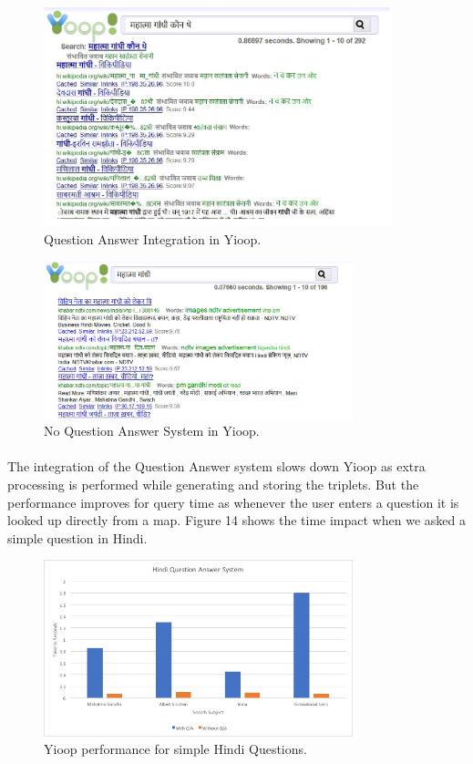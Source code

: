 \begin{figure}[htb]
\centering
\includegraphics[width=0.9\textwidth]{images/QA_IntegratedInYioop.jpg}
\caption{Question Answer Integration in Yioop.} 
\label{fig:QA_IntegratedInYioop}
\end{figure}
\break

\begin{figure}[htb]
\centering
\includegraphics[width=0.8\textwidth]{images/Yioop_NoQA.jpg}
\caption{No Question Answer System in Yioop.} 
\label{fig:Yioop_NoQA}
\end{figure}

\paragraph{}
The integration of the Question Answer system slows down Yioop as extra processing is performed while generating and storing the triplets. But the performance improves for query time as whenever the  user enters a question it is looked up directly from a map. Figure 14 shows the time impact when we asked a simple question in Hindi.

\begin{figure}[htb]
\centering
\includegraphics[width=0.8\textwidth]{images/QA_performance1.jpg}
\caption{Yioop performance for simple Hindi Questions.} 
\label{fig:QA_performance1}
\end{figure}

